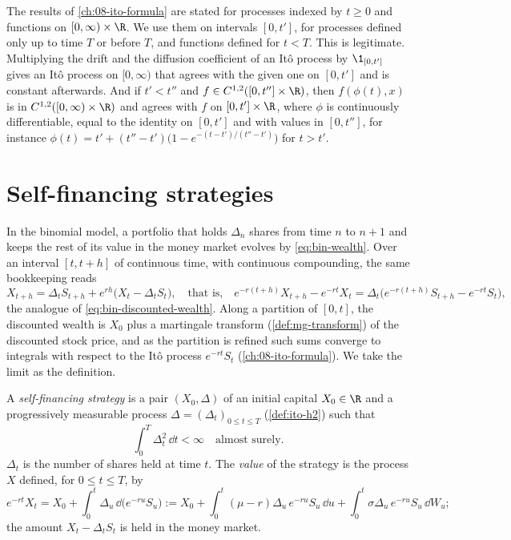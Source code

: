 The results of \cref{ch:08-ito-formula} are stated for processes indexed by $t\ge0$ and functions
on $[0,\infty)\times\R$. We use them on intervals $[0,t']$, for processes defined only up to time
$T$ or before $T$, and functions defined for $t<T$. This is legitimate. Multiplying the drift and
the diffusion coefficient of an It\^o process by $\1_{[0,t']}$ gives an It\^o process on
$[0,\infty)$ that agrees with the given one on $[0,t']$ and is constant afterwards. And if
$t'<t''$ and $f\in C^{1,2}([0,t'']\times\R)$, then $f(\phi(t),x)$ is in $C^{1,2}([0,\infty)\times\R)$
and agrees with $f$ on $[0,t']\times\R$, where $\phi$ is continuously differentiable, equal to the
identity on $[0,t']$ and with values in $[0,t'']$, for instance
$\phi(t)=t'+(t''-t')\big(1-e^{-(t-t')/(t''-t')}\big)$ for $t>t'$.

\section{Self-financing strategies}\label{sec:dh-strategies}

In the binomial model, a portfolio that holds $\Delta_n$ shares from time $n$ to $n+1$ and
keeps the rest of its value in the money market evolves by \eqref{eq:bin-wealth}. Over an
interval $[t,t+h]$ of continuous time, with continuous compounding, the same bookkeeping reads
\[
  X_{t+h}=\Delta_tS_{t+h}+e^{rh}\big(X_t-\Delta_tS_t\big),\quad\text{that is,}\quad
  e^{-r(t+h)}X_{t+h}-e^{-rt}X_t=\Delta_t\big(e^{-r(t+h)}S_{t+h}-e^{-rt}S_t\big),
\]
the analogue of \eqref{eq:bin-discounted-wealth}. Along a partition of $[0,t]$, the
discounted wealth is $X_0$ plus a martingale transform (\cref{def:mg-transform}) of the
discounted stock price, and as the partition is refined such sums converge to integrals with
respect to the It\^o process $e^{-rt}S_t$ (\cref{ch:08-ito-formula}). We take the limit as
the definition.

\begin{definition}\label{def:dh-self-financing}
A \emph{self-financing strategy} is a pair $(X_0,\Delta)$ of an initial capital $X_0\in\R$
and a progressively measurable process $\Delta=(\Delta_t)_{0\le t\le T}$
(\cref{def:ito-h2}) such that
\begin{equation}\label{eq:dh-integrability}
  \int_0^T\Delta_t^2\,\dd t<\infty\quad\text{almost surely.}
\end{equation}
$\Delta_t$ is the number of shares held at time $t$. The \emph{value} of the strategy is the
process $X$ defined, for $0\le t\le T$, by
\begin{equation}\label{eq:dh-discounted-wealth}
  e^{-rt}X_t=X_0+\int_0^t\Delta_u\,\dd\big(e^{-ru}S_u\big)
  :=X_0+\int_0^t(\mu-r)\Delta_u\,e^{-ru}S_u\,\dd u+\int_0^t\sigma\Delta_u\,e^{-ru}S_u\,\dd W_u ;
\end{equation}
the amount $X_t-\Delta_tS_t$ is held in the money market.
\end{definition}

